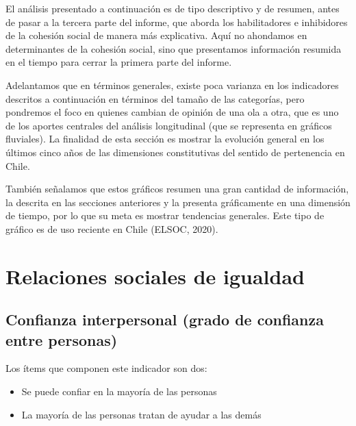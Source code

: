 \documentclass[
  12pt,
]{book}
\begin{document}
El análisis presentado a continuación es de tipo descriptivo y de resumen, antes de pasar a la tercera parte del informe, que aborda los habilitadores e inhibidores de la cohesión social de manera más explicativa. Aquí no ahondamos en determinantes de la cohesión social, sino que presentamos información resumida en el tiempo para cerrar la primera parte del informe.

Adelantamos que en términos generales, existe poca varianza en los indicadores descritos a continuación en términos del tamaño de las categorías, pero pondremos el foco en quienes cambian de opinión de una ola a otra, que es uno de los aportes centrales del análisis longitudinal (que se representa en gráficos fluviales). La finalidad de esta sección es mostrar la evolución general en los últimos cinco años de las dimensiones constitutivas del sentido de pertenencia en Chile.

También señalamos que estos gráficos resumen una gran cantidad de información, la descrita en las secciones anteriores y la presenta gráficamente en una dimensión de tiempo, por lo que su meta es mostrar tendencias generales. Este tipo de gráfico es de uso reciente en Chile (ELSOC, 2020).

\hypertarget{relaciones-sociales-de-igualdad-1}{%
\section{Relaciones sociales de igualdad}\label{relaciones-sociales-de-igualdad-1}}

\hypertarget{confianza-interpersonal-grado-de-confianza-entre-personas}{%
\subsection{Confianza interpersonal (grado de confianza entre personas)}\label{confianza-interpersonal-grado-de-confianza-entre-personas}}

Los ítems que componen este indicador son dos:

\begin{itemize}
\item
  Se puede confiar en la mayoría de las personas
\item
  La mayoría de las personas tratan de ayudar a las demás
\end{itemize}
\end{document}
